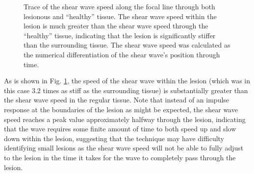 			\begin{figure}[!htb]
				\centering
				\caption[Sample trace of shear wave speed through the focal line]{Trace of the shear wave speed along the focal line through both lesionous and ``healthy'' tissue. The shear wave speed within the lesion is much greater than the shear wave speed through the ``healthy'' tissue, indicating that the lesion is significantly stiffer than the surrounding tissue. The shear wave speed was calculated as the numerical differentiation of the shear wave's position through time.}
				\label{fig:lateral_cut_i158_shear_wave_speed}
			\end{figure}

			As is shown in Fig. \ref{fig:lateral_cut_i158_shear_wave_speed}, the speed of the shear wave within the lesion (which was in this case 3.2 times as stiff as the surrounding tissue) is substantially greater than the shear wave speed in the regular tissue. Note that instead of an impulse response at the boundaries of the lesion as might be expected, the shear wave speed reaches a peak value approximately halfway through the lesion, indicating that the wave requires some finite amount of time to both speed up and slow down within the lesion, suggesting that the technique may have difficulty identifying small lesions as the shear wave speed will not be able to fully adjust to the lesion in the time it takes for the wave to completely pass through the lesion.

